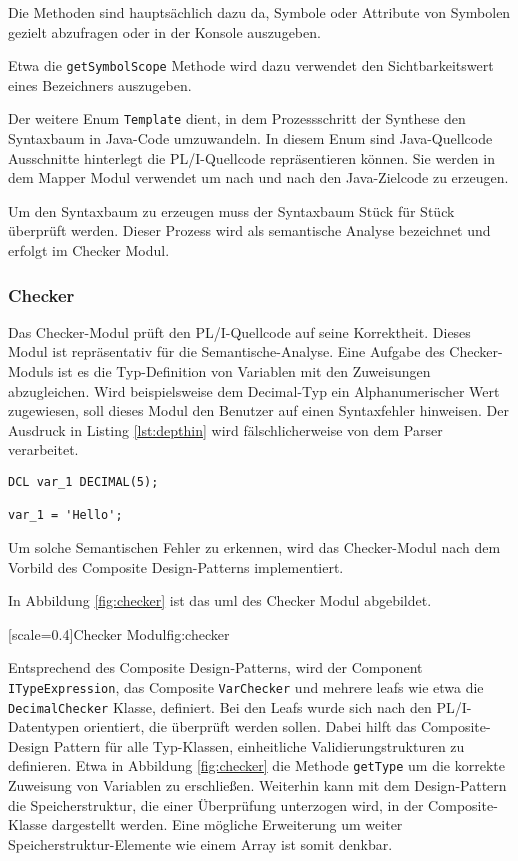 Die Methoden sind hauptsächlich dazu da, Symbole oder Attribute von Symbolen gezielt abzufragen oder in der Konsole auszugeben.

Etwa die \verb+getSymbolScope+ Methode wird dazu verwendet den Sichtbarkeitswert eines Bezeichners auszugeben.

Der weitere Enum \verb+Template+ dient, in dem Prozessschritt der Synthese den Syntaxbaum in Java-Code umzuwandeln.
In diesem Enum sind Java-Quellcode Ausschnitte hinterlegt die PL/I-Quellcode repräsentieren können. Sie werden in dem Mapper Modul verwendet
um nach und nach den Java-Zielcode zu erzeugen.

Um den Syntaxbaum zu erzeugen muss der Syntaxbaum Stück für Stück überprüft werden. Dieser Prozess wird als semantische Analyse bezeichnet und erfolgt im Checker Modul.
 
\subsubsection{Checker}
Das Checker-Modul prüft den PL/I-Quellcode auf seine Korrektheit. 
Dieses Modul ist repräsentativ für die Semantische-Analyse. 
Eine Aufgabe des Checker-Moduls ist es die Typ-Definition von Variablen mit den Zuweisungen abzugleichen.
Wird beispielsweise dem Decimal-Typ ein Alphanumerischer Wert zugewiesen, soll dieses Modul den Benutzer auf einen Syntaxfehler hinweisen.
Der Ausdruck in Listing \ref{lst:depthin} wird fälschlicherweise von dem Parser verarbeitet.

\begin{lstlisting}[language=PL/I, caption=Deklaration einer Varibale des Typs Decimal, label={lst:decimal}]
DCL var_1 DECIMAL(5);

var_1 = 'Hello';
\end{lstlisting}

Um solche Semantischen Fehler zu erkennen, wird das Checker-Modul nach dem Vorbild des Composite Design-Patterns implementiert.

In Abbildung \ref{fig:checker} ist das \ac{uml} des Checker Modul abgebildet.

[scale=0.4]{Checker Modul}{fig:checker}
\pagebreak

Entsprechend des Composite Design-Patterns, wird der Component \verb+ITypeExpression+, das Composite \verb+VarChecker+ und mehrere leafs wie etwa die \verb+DecimalChecker+ Klasse, definiert.
Bei den Leafs wurde sich nach den PL/I-Datentypen orientiert, die überprüft werden sollen.
Dabei hilft das Composite-Design Pattern für alle Typ-Klassen, einheitliche Validierungstrukturen zu definieren.
Etwa in Abbildung \ref{fig:checker} die Methode \verb+getType+ um die korrekte Zuweisung von Variablen zu erschließen. 
Weiterhin kann mit dem Design-Pattern die Speicherstruktur, die einer Überprüfung unterzogen wird, in der Composite-Klasse dargestellt werden.
Eine mögliche Erweiterung um weiter Speicherstruktur-Elemente wie einem Array ist somit denkbar.

